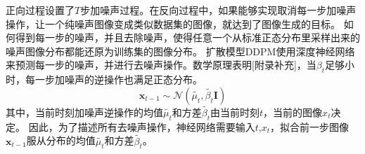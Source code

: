 正向过程设置了$T$步加噪声过程。在反向过程中，如果能够实现取消每一步加噪声操作，让一个纯噪声图像变成类似数据集的图像，就达到了图像生成的目标。
如何得到每一步的噪声，并且去除噪声，使得任意一个从标准正态分布里采样出来的噪声图像分布都能还原为训练集的图像分布。
扩散模型DDPM使用深度神经网络来预测每一步的噪声，并进行去噪声操作。数学原理表明[附录补充]，当$\beta_t$足够小时，每一步加噪声的逆操作也满足正态分布。
\begin{equation}
    \mathbf{x}_{t-1}\sim\mathcal{N}(\tilde{\mu_t},\tilde{\beta_t}\mathbf{I})
\end{equation}
其中，当前时刻加噪声逆操作的均值$\tilde{\mu_t}$和方差$\tilde{\beta_t}$由当前时刻$t$，当前的图像$x_t$决定。
因此，为了描述所有去噪声操作，神经网络需要输入$t$,$x_t$，拟合前一步图像$\mathbf{x}_{t-1}$服从分布的均值$\tilde{\mu_t}$和方差$\tilde{\beta_t}$。

